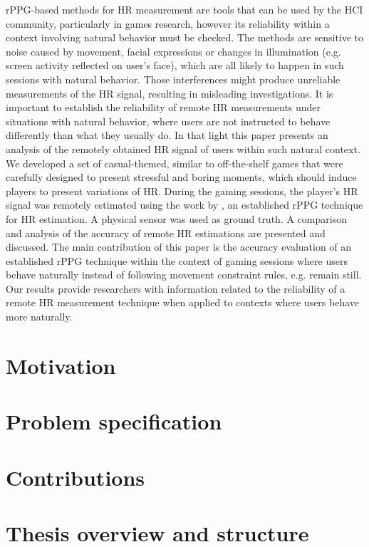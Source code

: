 rPPG-based methods for HR measurement are tools that can be used by the HCI community, particularly in games research, however its reliability within a context involving natural behavior must be checked. The methods are sensitive to noise caused by movement, facial expressions or changes in illumination (e.g. screen activity reflected on user's face), which are all likely to happen in such sessions with natural behavior. Those interferences might produce unreliable measurements of the HR signal, resulting in misleading investigations. It is important to establish the reliability of remote HR measurements under situations with natural behavior, where users are not instructed to behave differently than what they usually do. In that light this paper presents an analysis of the remotely obtained HR signal of users within such natural context. We developed a set of casual-themed, similar to off-the-shelf games that were carefully designed to present stressful and boring moments, which should induce players to present variations of HR. During the gaming sessions, the player's HR signal was remotely estimated using the work by \citet{poh2011advancements}, an established rPPG technique for HR estimation. A physical sensor was used as ground truth. A comparison and analysis of the accuracy of remote HR estimations are presented and discussed. The main contribution of this paper is the accuracy evaluation of an established rPPG technique within the context of gaming sessions where users behave naturally instead of following movement constraint rules, e.g. remain still. Our results provide researchers with information related to the reliability of a remote HR measurement technique when applied to contexts where users behave more naturally.

\section{Motivation}

\section{Problem specification}

\section{Contributions}

\section{Thesis overview and structure}
